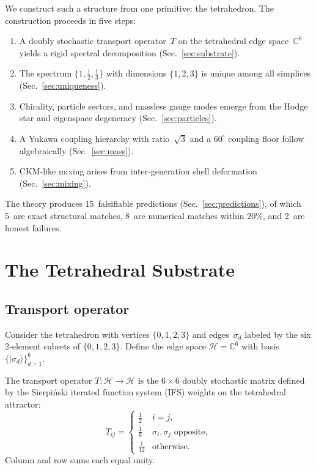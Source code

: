 \documentclass[%
 aip,
 amsmath,amssymb,
 reprint,%
]{revtex4-1}
\newcommand{\half}{\tfrac{1}{2}}
\newcommand{\third}{\tfrac{1}{3}}
\newcommand{\sixth}{\tfrac{1}{6}}
\newcommand{\twelfth}{\tfrac{1}{12}}
\newcommand{\CC}{\mathbb{C}}
\newcommand{\HH}{\mathcal{H}}
\begin{document}
We construct such a structure from one primitive: the tetrahedron. The construction proceeds in five steps:
\begin{enumerate}
\item A doubly stochastic transport operator~$T$ on the tetrahedral edge space~$\CC^6$ yields a rigid spectral decomposition (Sec.~\ref{sec:substrate}).
\item The spectrum $\{1,\half,\third\}$ with dimensions $\{1,2,3\}$ is unique among all simplices (Sec.~\ref{sec:uniqueness}).
\item Chirality, particle sectors, and massless gauge modes emerge from the Hodge star and eigenspace degeneracy (Sec.~\ref{sec:particles}).
\item A Yukawa coupling hierarchy with ratio~$\sqrt{3}$ and a $60^\circ$ coupling floor follow algebraically (Sec.~\ref{sec:mass}).
\item CKM-like mixing arises from inter-generation shell deformation (Sec.~\ref{sec:mixing}).
\end{enumerate}
The theory produces 15~falsifiable predictions (Sec.~\ref{sec:predictions}), of which 5~are exact structural matches, 8~are numerical matches within $20\%$, and 2~are honest failures.


\section{\label{sec:substrate}The Tetrahedral Substrate}

\subsection{\label{ssec:transport}Transport operator}

Consider the tetrahedron with vertices $\{0,1,2,3\}$ and edges~$\sigma_d$ labeled by the six 2-element subsets of $\{0,1,2,3\}$. Define the edge space $\HH=\CC^6$ with basis $\{|\sigma_d\rangle\}_{d=1}^{6}$.

The transport operator $T:\HH\to\HH$ is the $6\times6$ doubly stochastic matrix defined by the Sierpi\'nski iterated function system (IFS) weights on the tetrahedral attractor:
\begin{equation}\label{eq:transport}
T_{ij}=\begin{cases}
\half & i=j,\\[4pt]
\sixth & \sigma_i,\sigma_j\text{ opposite},\\[4pt]
\twelfth & \text{otherwise}.
\end{cases}
\end{equation}
Column and row sums each equal unity.
\end{document}
